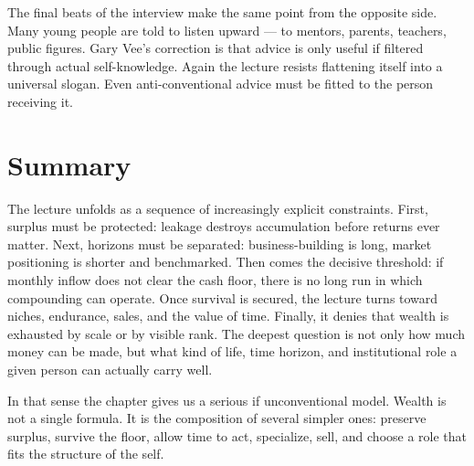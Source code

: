 The final beats of the interview make the same point from the opposite side. Many young people are told to listen upward --- to mentors, parents, teachers, public figures. Gary Vee's correction is that advice is only useful if filtered through actual self-knowledge. Again the lecture resists flattening itself into a universal slogan. Even anti-conventional advice must be fitted to the person receiving it.

\section{Summary}

The lecture unfolds as a sequence of increasingly explicit constraints. First, surplus must be protected: leakage destroys accumulation before returns ever matter. Next, horizons must be separated: business-building is long, market positioning is shorter and benchmarked. Then comes the decisive threshold: if monthly inflow does not clear the cash floor, there is no long run in which compounding can operate. Once survival is secured, the lecture turns toward niches, endurance, sales, and the value of time. Finally, it denies that wealth is exhausted by scale or by visible rank. The deepest question is not only how much money can be made, but what kind of life, time horizon, and institutional role a given person can actually carry well.

In that sense the chapter gives us a serious if unconventional model. Wealth is not a single formula. It is the composition of several simpler ones: preserve surplus, survive the floor, allow time to act, specialize, sell, and choose a role that fits the structure of the self.